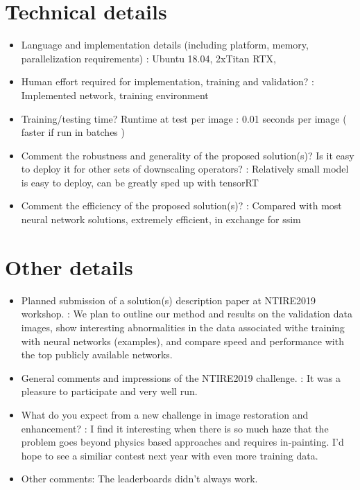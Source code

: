 \documentclass{article}
\begin{document}
\section{Technical details}
\begin{itemize}
\item Language and implementation details (including platform, memory, parallelization requirements) : Ubuntu 18.04, 2xTitan RTX,
\item Human effort required for implementation, training and validation? : Implemented network, training environment
\item Training/testing time? Runtime at test per image : 0.01 seconds per image ( faster if run in batches )
\item Comment the robustness and generality of the proposed solution(s)? Is it easy to deploy it for other sets of downscaling operators? : Relatively small model is easy to deploy, can be greatly sped up with tensorRT
\item Comment the efficiency of the proposed solution(s)? : Compared with most neural network solutions, extremely efficient, in exchange for ssim
\end{itemize}

\section{Other details}
\begin{itemize}
\item Planned submission of a solution(s) description paper at NTIRE2019 workshop. : We plan to outline our method and results on the validation data images, show interesting abnormalities in the data associated withe training with neural networks (examples), and compare speed and performance with the top publicly available networks.
\item General comments and impressions of the NTIRE2019 challenge. : It was a pleasure to participate and very well run.
\item What do you expect from a new challenge in image restoration and enhancement? : I find it interesting when there is so much haze that the problem goes beyond physics based approaches and requires in-painting. I'd hope to see a similiar contest next year with even more training data.
\item Other comments: The leaderboards didn't always work.
\end{itemize}
\end{document}
